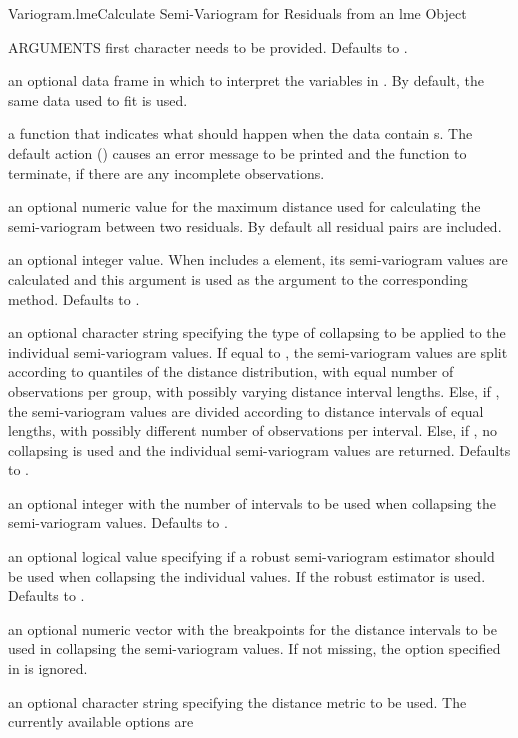 \documentclass[pdftex]{article} \usepackage{url,graphicx}
\begin{document}
\begin{Helpfile}{Variogram.lme}{Calculate Semi-Variogram for Residuals
    from an lme Object}
\begin{Argument}{ARGUMENTS}
first character needs to be provided. Defaults to .
\item[\Co{data:}]
an optional data frame in which to interpret the variables
in . By default, the same data used to fit 
is used.
\item[\Co{na.action:}]
a function that indicates what should happen when the
data contain s. The default action () causes
an error message to be printed and the function to terminate, if there
are any incomplete observations.
\item[\Co{maxDist:}]
an optional numeric value for the maximum distance used
for calculating the semi-variogram between two residuals. By default
all residual pairs are included.
\item[\Co{length.out:}]
an optional integer value. When 
includes a  element, its semi-variogram values are
calculated and this argument is used as the 
argument to the corresponding  method. Defaults to
.
\item[\Co{collapse:}]
an optional character string specifying the type of
collapsing to be applied to the individual semi-variogram values. If
equal to , the semi-variogram values are split
according to quantiles of the distance distribution, with equal
number of observations per group, with possibly varying distance
interval lengths. Else, if , the semi-variogram values
are divided according to distance intervals of equal lengths, with
possibly different number of observations per interval. Else, if
, no collapsing is used and the individual
semi-variogram values are returned. Defaults to .
\item[\Co{nint:}]
an optional integer with the number of intervals to be
used when collapsing the semi-variogram values. Defaults to .
\item[\Co{robust:}]
an optional logical value specifying if a robust
semi-variogram estimator should be used when collapsing the
individual values. If  the robust estimator is
used. Defaults to .
\item[\Co{breaks:}]
an optional numeric vector with the breakpoints for the
distance intervals to be used in collapsing the semi-variogram
values. If not missing, the option specified in  is
ignored.
\item[\Co{metric:}]
an optional character string specifying the distance
metric to be used. The currently available options are

\end{Argument}
\end{Helpfile}
\end{document}
